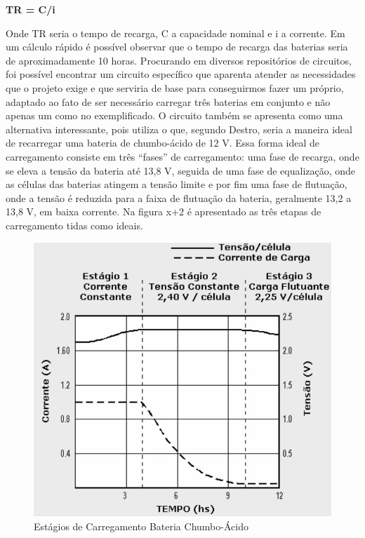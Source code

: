 \textbf{\centering TR = C/i}

Onde TR seria o tempo de recarga, C a capacidade nominal e i a corrente. 
Em um cálculo rápido é possível observar que o tempo de recarga das baterias seria de aproximadamente 10 horas. 
Procurando em diversos repositórios de circuitos, foi possível encontrar um circuito específico que aparenta atender as necessidades que o projeto exige e que serviria de base para conseguirmos fazer um próprio, adaptado ao fato de ser necessário carregar três baterias em conjunto e não apenas um como no exemplificado. O circuito também se apresenta como uma alternativa interessante, pois utiliza o que, segundo Destro, seria a maneira ideal de recarregar uma bateria de chumbo-ácido de 12 V. 
Essa forma ideal de carregamento consiste em três “fases” de carregamento: uma fase de recarga, onde se eleva a tensão da bateria até 13,8 V, seguida de uma fase de equalização, onde as células das baterias atingem a tensão limite e por fim uma fase de flutuação, onde a tensão é reduzida para a faixa de flutuação da bateria, geralmente 13,2 a 13,8 V, em baixa corrente. Na figura x+2 é apresentado as três etapas de carregamento tidas como ideais.

\newpage

	\begin{figure}[!htb]
		\centering
		\includegraphics[scale=0.4]{estagio_carregamento.jpeg}
		\caption{Estágios de Carregamento Bateria Chumbo-Ácido}
		\label{img:estagiocarregamento}
	\end{figure}

